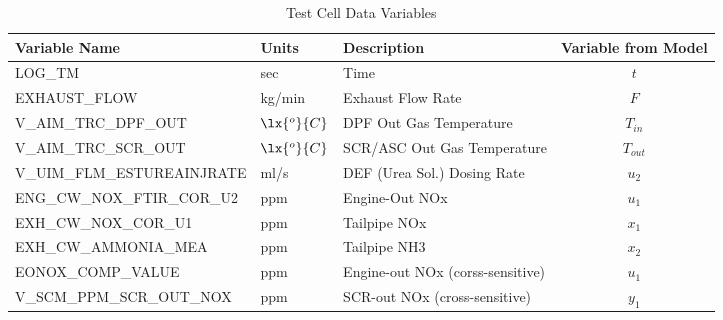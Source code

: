 \begin{table}[H]
\centering
\begin{tabular}{l l l c}
   \hline \hline
   Variable Name              & Units     & Description & Variable from Model \\ \hline \hline
   LOG\_TM	                  & sec & Time
                                          & $t$\\
   EXHAUST\_FLOW	            & kg/min    & Exhaust Flow Rate
                                          & $F$\\
   V\_AIM\_TRC\_DPF\_OUT	   & $\lx{^o}{C}$ & DPF Out Gas Temperature
                                             & $T_{in}$\\
   V\_AIM\_TRC\_SCR\_OUT	   & $\lx{^o}{C}$ & SCR/ASC Out Gas Temperature
                                          & $T_{out}$\\
   V\_UIM\_FLM\_ESTUREAINJRATE& ml/s      & DEF (Urea Sol.) Dosing Rate
                                          & $u_2$\\
   ENG\_CW\_NOX\_FTIR\_COR\_U2& ppm       & Engine-Out NOx
                                          & $u_1$\\
   EXH\_CW\_NOX\_COR\_U1	   & ppm       & Tailpipe NOx
                                          & $x_1$\\
   EXH\_CW\_AMMONIA\_MEA	   & ppm       & Tailpipe NH3
                                          & $x_2$\\
EONOX\_COMP\_VALUE	         & ppm       & Engine-out NOx (corss-sensitive)
                                          & $u_1$\\
V\_SCM\_PPM\_SCR\_OUT\_NOX	   & ppm       & SCR-out NOx (cross-sensitive)
                                          & $y_1$\\
   \hline \hline
\end{tabular}
\caption{Test Cell Data Variables}
\end{table}






